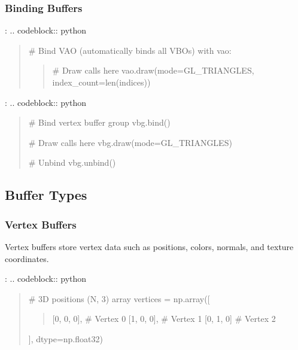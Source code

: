\documentclass[a4paper,10pt,english,openany,oneside]{sphinxmanual}
\begin{document}
\subsubsection{Binding Buffers}
\label{\detokenize{api/buffers:binding-buffers}}
\sphinxAtStartPar
{}:
.. code\sphinxhyphen{}block:: python
\begin{quote}

\sphinxAtStartPar
\# Bind VAO (automatically binds all VBOs)
with vao:
\begin{quote}

\sphinxAtStartPar
\# Draw calls here
vao.draw(mode=GL\_TRIANGLES, index\_count=len(indices))
\end{quote}
\end{quote}

\sphinxAtStartPar
{}:
.. code\sphinxhyphen{}block:: python
\begin{quote}

\sphinxAtStartPar
\# Bind vertex buffer group
vbg.bind()

\sphinxAtStartPar
\# Draw calls here
vbg.draw(mode=GL\_TRIANGLES)

\sphinxAtStartPar
\# Unbind
vbg.unbind()
\end{quote}


\subsection{Buffer Types}
\label{\detokenize{api/buffers:buffer-types}}

\subsubsection{Vertex Buffers}
\label{\detokenize{api/buffers:vertex-buffers}}
\sphinxAtStartPar
Vertex buffers store vertex data such as positions, colors, normals, and texture coordinates.

\sphinxAtStartPar
{}:
.. code\sphinxhyphen{}block:: python
\begin{quote}

\sphinxAtStartPar
\# 3D positions (N, 3) array
vertices = np.array({[}
\begin{quote}

\sphinxAtStartPar
{[}0, 0, 0{]},  \# Vertex 0
{[}1, 0, 0{]},  \# Vertex 1
{[}0, 1, 0{]}   \# Vertex 2
\end{quote}

\sphinxAtStartPar
{]}, dtype=np.float32)
\end{quote}
\end{document}
